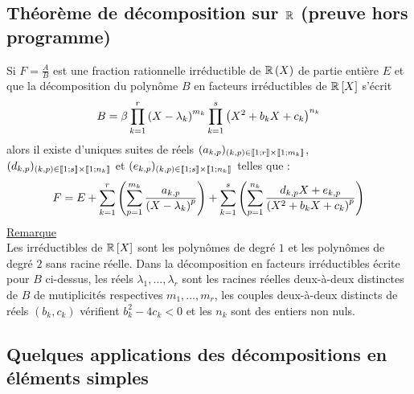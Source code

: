 \subsection{Théorème de décomposition sur \(\mathbb{R}\) (preuve hors programme)}
\begin{defprop}
    Si \(F = \frac{A}{B}\) est une fraction rationnelle irréductible de \(\mathbb{R}\left(X\right)\) de partie entière \(E\) et que la décomposition du polynôme \(B\) en facteurs irréductibles de \(\mathbb{R} \left[X\right]\) s’écrit 
    \[B = \beta \prod^r_{k=1} \left(X - \lambda_k\right)^{m_k} \prod^s_{k=1} \left(X^2 + b_kX + c_k\right)^{n_k}\]
    alors il existe d’uniques suites de réels \((a_{k,p})_{(k,p)\in \left\llbracket1;r\right\rrbracket\times \left\llbracket1;m_k\right\rrbracket}\), \((d_{k,p})_{(k,p)\in \left\llbracket1;s\right\rrbracket\times \left\llbracket1;n_k\right\rrbracket}\) et \((e_{k,p})_{(k,p)\in \left\llbracket1;s\right\rrbracket\times \left\llbracket1;n_k\right\rrbracket}\) telles que :
    \[F = E + \sum^r_{k=1}\left(\sum^{m_k}_{p=1} \frac{a_{k,p}}{\left(X - \lambda_k\right)^p}\right) + \sum^s_{k=1} \left(\sum^{n_k}_{p=1}\frac{d_{k,p}X + e_{k,p}}{\left(X^2 + b_kX + c_k\right)^p}\right)\]
    \underline{Remarque} \\
    Les irréductibles de \(\mathbb{R} \left[X\right]\) sont les polynômes de degré \(1\) et les polynômes de degré \(2\) sans racine réelle. Dans la décomposition en facteurs irréductibles écrite pour \(B\) ci-dessus, les réels \(\lambda_1, \dots , \lambda_r\) sont les racines réelles deux-à-deux distinctes de \(B\) de mutiplicités respectives \(m_1, \dots , m_r\), les couples deux-à-deux distincts de réels \((b_k, c_k)\) vérifient \(b^2_k - 4c_k < 0\) et les \(n_k\) sont des entiers non nuls.
\end{defprop}
\subsection{Quelques applications des décompositions en éléments simples}
\begin{defprop}
    
\end{defprop}
\begin{defprop}
    
\end{defprop}
\begin{defprop}
    
\end{defprop}

